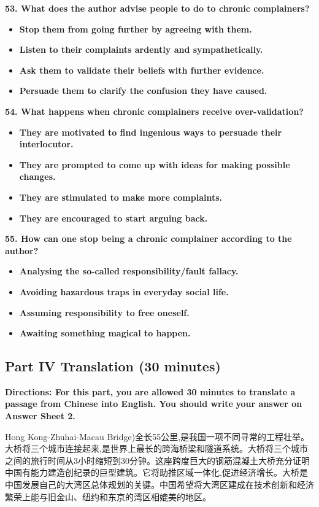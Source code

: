\documentclass[UTF8,11pt]{ctexart}
\begin{document}
\textbf{53. What does the author advise people to do to chronic complainers?}


\begin{itemize}[leftmargin=2em,itemsep=.2em,topsep=.4em]\item[A.] \textbf{Stop them from going further by agreeing with them.}
\item[B.] \textbf{Listen to their complaints ardently and sympathetically.}
\item[C.] \textbf{Ask them to validate their beliefs with further evidence.}
\item[D.] \textbf{Persuade them to clarify the confusion they have caused.}
\end{itemize}

\textbf{54. What happens when chronic complainers receive over-validation?}


\begin{itemize}[leftmargin=2em,itemsep=.2em,topsep=.4em]\item[A.] \textbf{They are motivated to find ingenious ways to persuade their interlocutor.}
\item[B.] \textbf{They are prompted to come up with ideas for making possible changes.}
\item[C.] \textbf{They are stimulated to make more complaints.}
\item[D.] \textbf{They are encouraged to start arguing back.}
\end{itemize}

\textbf{55. How can one stop being a chronic complainer according to the author?}


\begin{itemize}[leftmargin=2em,itemsep=.2em,topsep=.4em]\item[A.] \textbf{Analysing the so-called responsibility/fault fallacy.}
\item[B.] \textbf{Avoiding hazardous traps in everyday social life.}
\item[C.] \textbf{Assuming responsibility to free oneself.}
\item[D.] \textbf{Awaiting something magical to happen.}
\end{itemize}

\subsection*{\textbf{Part IV} \textbf{Translation} \textbf{(30 minutes)}}


\textbf{Directions: For this part, you are allowed 30 minutes to translate a passage from Chinese into English. You should write} \textbf{your answer on Answer Sheet 2.}


Hong Kong-Zhuhai-Macau Bridge)全长55公里,是我国一项不同寻常的工程壮举。大桥将三个城市连接起来,是世界上最长的跨海桥梁和隧道系统。大桥将三个城市之间的旅行时间从3小时缩短到30分钟。这座跨度巨大的钢筋混凝土大桥充分证明中国有能力建造创纪录的巨型建筑。它将助推区域一体化,促进经济增长。大桥是中国发展自己的大湾区总体规划的关键。中国希望将大湾区建成在技术创新和经济繁荣上能与旧金山、纽约和东京的湾区相媲美的地区。
\end{document}
